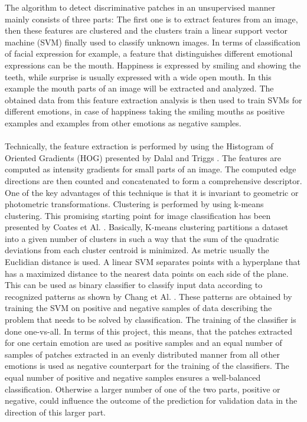 The algorithm to detect discriminative patches in an unsupervised manner mainly consists of three parts: The first one is to extract features from an image, then these features are clustered and the clusters train a linear support vector machine (SVM) finally used to classify unknown images. In terms of classification of facial expression for example, a feature that distinguishes different emotional expressions can be the mouth. Happiness is expressed by smiling and showing the teeth, while surprise is usually expressed with a wide open mouth. In this example the mouth parts of an image will be extracted and analyzed. The obtained data from this feature extraction analysis is then used to train SVMs for different emotions, in case of happiness taking the smiling mouths as positive examples and examples from other emotions as negative samples.
\\
\\
Technically, the feature extraction is performed by using the Histogram of Oriented Gradients (HOG) presented by Dalal and Triggs \cite{Dalal:2005:HOG:1068507.1069007}. The features are computed as intensity gradients for small parts of an image. The computed edge directions are then counted and concatenated to form a comprehensive descriptor. One of the key advantages of this technique is that it is invariant to geometric or photometric transformations. Clustering is performed by using k-means clustering. This promising starting point for image classification has been presented by Coates et Al. \cite{DBLP:series/lncs/CoatesN12}. Basically, K-means clustering partitions a dataset into a given number of clusters in such a way that the sum of the quadratic deviations from each cluster centroid is minimized. As metric usually the Euclidian distance is used. A linear SVM separates points with a hyperplane that has a maximized distance to the nearest data points on each side of the plane. This can be used as binary classifier to classify input data according to recognized patterns as shown by Chang et Al. \cite{Chang:2011:LLS:1961189.1961199}. These patterns are obtained by training the SVM on positive and negative samples of data describing the problem that needs to be solved by classification. The training of the classifier is done one-vs-all. In terms of this project, this means, that the patches extracted for one certain emotion are used as positive samples and an equal number of samples of patches extracted in an evenly distributed manner from all other emotions is used as negative counterpart for the training of the classifiers. The equal number of positive and negative samples ensures a well-balanced classification. Otherwise a larger number of one of the two parts, positive or negative, could influence the outcome of the prediction for validation data in the direction of this larger part.
